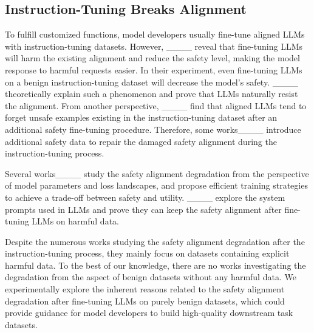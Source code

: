 \subsection{Instruction-Tuning Breaks Alignment}

To fulfill customized functions, model developers usually fine-tune aligned LLMs with instruction-tuning datasets. However, ____ reveal that fine-tuning LLMs will harm the existing alignment and reduce the safety level, making the model response to harmful requests easier. In their experiment, even fine-tuning LLMs on a benign instruction-tuning dataset will decrease the model's safety. ____ theoretically explain such a phenomenon and prove that LLMs naturally resist the alignment. From another perspective, ____ find that aligned LLMs tend to forget unsafe examples existing in the instruction-tuning dataset after an additional safety fine-tuning procedure. Therefore, some works____ introduce additional safety data to repair the damaged safety alignment during the instruction-tuning process.

Several works____ study the safety alignment degradation from the perspective of model parameters and loss landscapes, and propose efficient training strategies to achieve a trade-off between safety and utility. ____ explore the system prompts used in LLMs and prove they can keep the safety alignment after fine-tuning LLMs on harmful data.

Despite the numerous works studying the safety alignment degradation after the instruction-tuning process, they mainly focus on datasets containing explicit harmful data. To the best of our knowledge, there are no works investigating the degradation from the aspect of benign datasets without any harmful data. We experimentally explore the inherent reasons related to the safety alignment degradation after fine-tuning LLMs on purely benign datasets, which could provide guidance for model developers to build high-quality downstream task datasets.